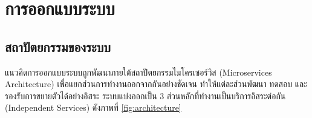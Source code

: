 \section{การออกแบบระบบ}

\subsection{สถาปัตยกรรมของระบบ}

แนวคิดการออกแบบระบบถูกพัฒนาภายใต้สถาปัตยกรรมไมโครเซอร์วิส (Microservices Architecture) เพื่อแยกส่วนการทำงานออกจากกันอย่างชัดเจน ทำให้แต่ละส่วนพัฒนา ทดสอบ และรองรับการขยายตัวได้อย่างอิสระ ระบบแบ่งออกเป็น 3 ส่วนหลักที่ทำงานเป็นบริการอิสระต่อกัน (Independent Services) ดังภาพที่ \ref{fig:architecture}

